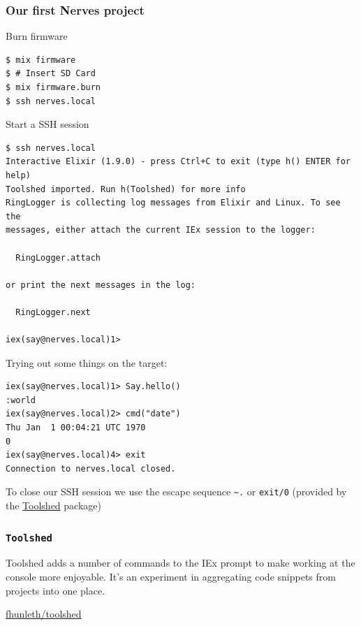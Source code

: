 \documentclass[10pt,xcolor=pdflatex,dvipsnames,table]{beamer}
\begin{document}
\begin{frame}[fragile]
\frametitle{Our first Nerves project}

\begin{overprint}
Burn firmware
\begin{example}
\begin{verbatim}
$ mix firmware
$ # Insert SD Card
$ mix firmware.burn
$ ssh nerves.local
\end{verbatim}
\end{example}

Start a SSH session
\begin{verbatim}
$ ssh nerves.local
Interactive Elixir (1.9.0) - press Ctrl+C to exit (type h() ENTER for help)
Toolshed imported. Run h(Toolshed) for more info
RingLogger is collecting log messages from Elixir and Linux. To see the
messages, either attach the current IEx session to the logger:

  RingLogger.attach

or print the next messages in the log:

  RingLogger.next

iex(say@nerves.local)1>
\end{verbatim}

Trying out some things on the \alert{target}:
\begin{example}
\begin{verbatim}
iex(say@nerves.local)1> Say.hello()
:world
iex(say@nerves.local)2> cmd("date")
Thu Jan  1 00:04:21 UTC 1970
0
iex(say@nerves.local)4> exit
Connection to nerves.local closed.
\end{verbatim}
\end{example}
To close our SSH session we use the escape sequence \alert{\texttt{\textasciitilde.}} or \alert{\texttt{exit/0}} (provided by the \href{https://github.com/fhunleth/toolshed}{Toolshed} package)
\end{overprint}
\end{frame}

\begin{frame}[standout]
  \frametitle{\texttt{Toolshed}}

  {\color{white}
  Toolshed adds a number of commands to the IEx prompt to make working at the
  console more enjoyable. It's an experiment in aggregating code snippets from
  projects into one place.

  \faGithub \hspace{1pt} \href{https://github.com/fhunleth/toolshed}{fhunleth/toolshed}
  }
\end{frame}
\end{document}
